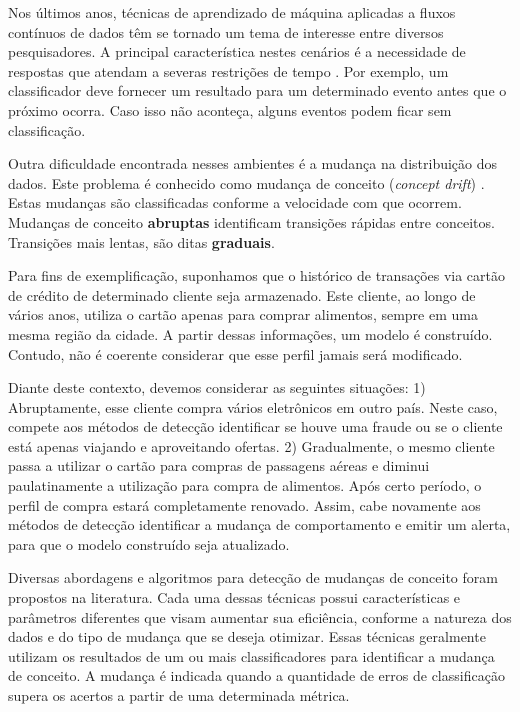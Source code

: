 \documentclass[qual, classic, a4paper]{ufbathesis}
\begin{document}
Nos últimos anos, técnicas de aprendizado de máquina aplicadas a fluxos contínuos de dados têm se tornado um tema de interesse entre diversos pesquisadores.
A principal característica nestes cenários é a necessidade de respostas que atendam a severas restrições de tempo \cite{Gama:2010:KDD:1855075}. 
Por exemplo, um classificador deve fornecer um resultado para um determinado evento antes que o próximo ocorra. 
Caso isso não aconteça, alguns eventos podem ficar sem classificação.

Outra dificuldade encontrada nesses ambientes é a mudança na distribuição dos dados. 
Este problema é conhecido como mudança de conceito (\textit{concept drift}) \cite{Gama:2010:KDD:1855075}.
Estas mudanças são classificadas conforme a velocidade com que ocorrem.
Mudanças de conceito \textbf{abruptas} identificam transições rápidas entre conceitos. 
Transições mais lentas, são ditas \textbf{graduais}.

Para fins de exemplificação, suponhamos que o histórico de transações via cartão de crédito de determinado cliente seja armazenado.
Este cliente, ao longo de vários anos, utiliza o cartão apenas para comprar alimentos, sempre em uma mesma região da cidade.
A partir dessas informações, um modelo é construído.
Contudo, não é coerente considerar que esse perfil jamais será modificado. 

Diante deste contexto, devemos considerar as seguintes situações:
1) Abruptamente, esse cliente compra vários eletrônicos em outro país.
Neste caso, compete aos métodos de detecção identificar se houve uma fraude ou se o cliente está apenas viajando e aproveitando ofertas.
2) Gradualmente, o mesmo cliente passa a utilizar o cartão para compras de passagens aéreas e diminui paulatinamente a utilização para compra de alimentos.
Após certo período, o perfil de compra estará completamente renovado.
Assim, cabe novamente aos métodos de detecção identificar a mudança de comportamento e emitir um alerta, 
para que o modelo construído seja atualizado.

Diversas abordagens e algoritmos para detecção de mudanças de conceito foram propostos na literatura.
Cada uma dessas técnicas possui características e parâmetros diferentes que visam aumentar sua eficiência, 
conforme a natureza dos dados e do tipo de mudança que se deseja otimizar.
Essas técnicas geralmente utilizam os resultados de um ou mais classificadores para identificar a mudança de conceito.
A mudança é indicada quando a quantidade de erros de classificação supera os acertos a partir de uma determinada métrica.
\end{document}
